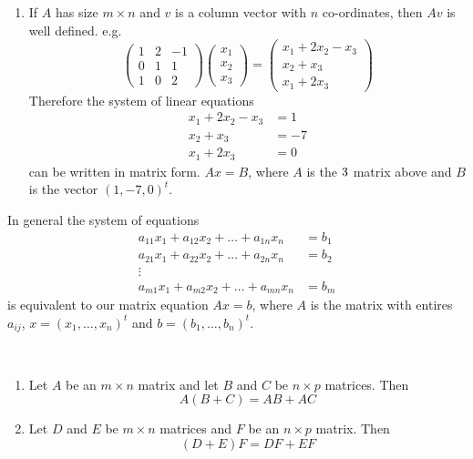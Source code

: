 \documentclass[10pt]{scrartcl}
\begin{document}
\begin{examples}
\begin{enumerate}
\item If $A$ has size $m \times n$ and $v$ is a column vector with $n$ co-ordinates, then $Av$ is well defined. e.g.
\[
  \begin{pmatrix}
  1 & 2 & -1\\ 0 & 1 & 1\\ 1 & 0 & 2	
  \end{pmatrix}\begin{pmatrix}
x_1 \\ x_2 \\ x_3	
\end{pmatrix} =
\begin{pmatrix}
x_1 + 2x_2 - x_3\\
x_2 + x_3\\
x_1 + 2x_3	
\end{pmatrix}
\]
Therefore the system of linear equations 
\begin{align*}
  x_1 + 2x_2 - x_3 &= 1\\
  x_2 + x_3 &= -7\\
  x_1 + 2x_3 &= 0
\end{align*}
can be written in matrix form. $Ax = B$, where $A$ is the $3 \time 3$ matrix above and $B$ is the vector $(1,-7,0)^t$.
\end{enumerate}
\end{examples}

In general the system of equations
\begin{align*}
  a_{11}x_1 + a_{12}x_2 +\dots + a_{1n}x_n &= b_1\\
  a_{21}x_1 + a_{22}x_2 + \dots + a_{2n}x_n &= b_2\\
  \vdots\\
  a_{m1}x_1  + a_{m2}x_2 + \dots + a_{mn}x_n &= b_m
\end{align*}
is equivalent to our matrix equation $Ax = b$, where $A$ is the matrix with entires $a_{ij}$, $x = (x_1,\dots,x_n)^t$ and $b = (b_1,\dots,b_n)^t$.\\

\begin{proposition}~\\[-0.3cm]
\begin{enumerate}
\item Let $A$ be an $m \times n$ matrix and let $B$ and $C$ be $n \times p$ matrices. Then \[A(B + C) = AB + AC\]
\item Let $D$ and $E$ be $m \times n$ matrices and $F$ be an $n \times p$ matrix. Then \[(D+E)F = DF + EF\]	
\end{enumerate}
\end{proposition}
\end{document}
